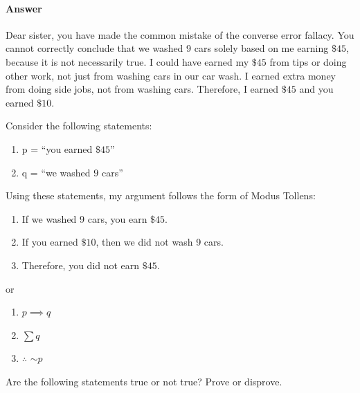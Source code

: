 \documentclass{article}
\begin{document}
\paragraph{Answer}

Dear sister, you have made the common mistake of the converse error fallacy. You cannot correctly conclude that we washed 9 cars solely based on me earning $\$45$, because it is not necessarily true. I could have earned my $\$45$ from tips or doing other work, not just from washing cars in our car wash. I earned extra money from doing side jobs, not from washing cars. Therefore, I earned $\$45$ and you earned $\$10$.

Consider the following statements:
\begin{enumerate}
    \item p = ``you earned $\$45$''
    \item q = ``we washed $9$ cars''
\end{enumerate}

Using these statements, my argument follows the form of Modus Tollens:

\begin{enumerate}
    \item If we washed 9 cars, you earn $\$45$.
    \item If you earned $\$10$, then we did not wash 9 cars.
    \item Therefore, you did not earn $\$45$.
\end{enumerate}

or 

\begin{enumerate}
    \item $p\implies q$
    \item $\sum q$
    \item $\therefore$ $\sim p$
\end{enumerate}
\collab{\todo{}}

Are the following statements true or not true?    Prove or disprove.
\end{document}
